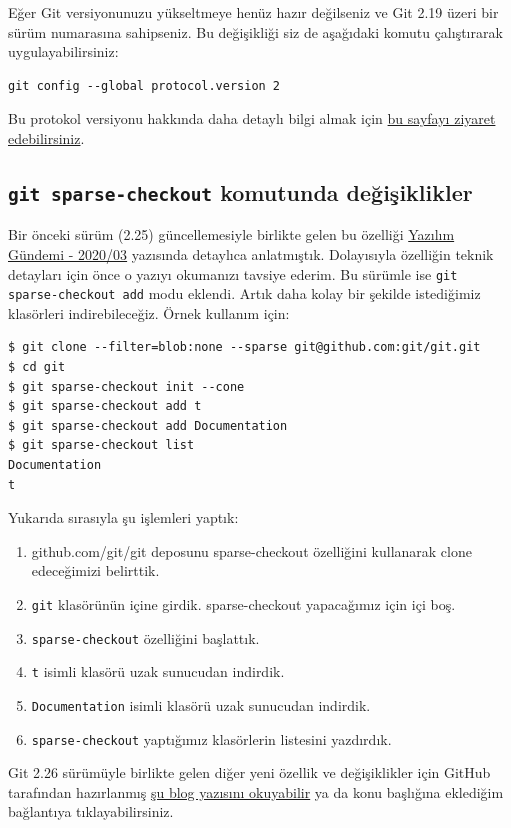 \documentclass[11pt]{article}
\begin{document}
Eğer Git versiyonunuzu yükseltmeye henüz hazır değilseniz ve Git 2.19 üzeri
bir sürüm numarasına sahipseniz. Bu değişikliği siz de aşağıdaki komutu
çalıştırarak uygulayabilirsiniz:

\begin{verbatim}
git config --global protocol.version 2
\end{verbatim}

Bu protokol versiyonu hakkında daha detaylı bilgi almak için \href{https://opensource.googleblog.com/2018/05/introducing-git-protocol-version-2.html}{bu sayfayı
ziyaret edebilirsiniz}.
\subsection{\texttt{git sparse-checkout} komutunda değişiklikler}
\label{sec:orgbd32d74}
Bir önceki sürüm (2.25) güncellemesiyle birlikte gelen bu özelliği \href{../03/yazilim-gundemi-2020-03.pdf}{Yazılım
Gündemi - 2020/03} yazısında detaylıca anlatmıştık. Dolayısıyla özelliğin
teknik detayları için önce o yazıyı okumanızı tavsiye ederim. Bu sürümle
ise \texttt{git sparse-checkout add} modu eklendi. Artık daha kolay bir şekilde
istediğimiz klasörleri indirebileceğiz. Örnek kullanım için:

\begin{verbatim}
$ git clone --filter=blob:none --sparse git@github.com:git/git.git
$ cd git
$ git sparse-checkout init --cone
$ git sparse-checkout add t
$ git sparse-checkout add Documentation
$ git sparse-checkout list
Documentation
t
\end{verbatim}
Yukarıda sırasıyla şu işlemleri yaptık:
\begin{enumerate}
\item github.com/git/git deposunu sparse-checkout özelliğini kullanarak clone
edeceğimizi belirttik.
\item \texttt{git} klasörünün içine girdik. sparse-checkout yapacağımız için içi boş.
\item \texttt{sparse-checkout} özelliğini başlattık.
\item \texttt{t} isimli klasörü uzak sunucudan indirdik.
\item \texttt{Documentation} isimli klasörü uzak sunucudan indirdik.
\item \texttt{sparse-checkout} yaptığımız klasörlerin listesini yazdırdık.
\end{enumerate}

Git 2.26 sürümüyle birlikte gelen diğer yeni özellik ve değişiklikler için
GitHub tarafından hazırlanmış \href{https://github.blog/2020-03-22-highlights-from-git-2-26/}{şu blog yazısını okuyabilir} ya da konu başlığına
eklediğim bağlantıya tıklayabilirsiniz.
\end{document}
